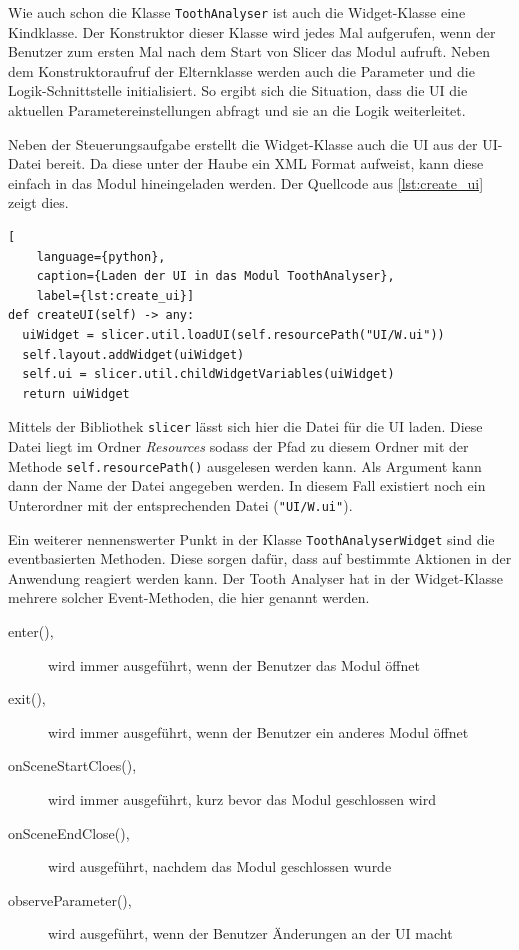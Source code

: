 Wie auch schon die Klasse \texttt{ToothAnalyser} ist auch die Widget-Klasse eine
Kindklasse. Der Konstruktor dieser Klasse wird jedes Mal aufgerufen, wenn der Benutzer
zum ersten Mal nach dem Start von Slicer das Modul aufruft. Neben dem
Konstruktoraufruf der Elternklasse werden auch die Parameter und die Logik-Schnittstelle
initialisiert. So ergibt sich die Situation, dass die \ac{UI} die aktuellen Parametereinstellungen
abfragt und sie an die Logik weiterleitet.

Neben der Steuerungsaufgabe erstellt die Widget-Klasse auch die \ac{UI} aus der
\ac{UI}-Datei bereit. Da diese unter der Haube ein \ac{XML} Format aufweist,
kann diese einfach in das Modul hineingeladen werden. Der Quellcode aus \ref{lst:create_ui}
zeigt dies.

\begin{lstlisting}[
    language={python},
    caption={Laden der UI in das Modul ToothAnalyser},
    label={lst:create_ui}]
def createUI(self) -> any:
  uiWidget = slicer.util.loadUI(self.resourcePath("UI/W.ui"))
  self.layout.addWidget(uiWidget)
  self.ui = slicer.util.childWidgetVariables(uiWidget)
  return uiWidget
\end{lstlisting}

Mittels der Bibliothek \texttt{slicer} lässt sich hier die Datei für die \ac{UI}
laden. Diese Datei liegt im Ordner \textit{Resources} sodass der Pfad zu diesem
Ordner mit der Methode \texttt{self.resourcePath()} ausgelesen werden kann. Als
Argument kann dann der Name der Datei angegeben werden. In diesem Fall existiert
noch ein Unterordner mit der entsprechenden Datei (\texttt{"UI/W.ui"}).

Ein weiterer nennenswerter Punkt in der Klasse \texttt{ToothAnalyserWidget} sind
die eventbasierten Methoden. Diese sorgen dafür, dass auf bestimmte Aktionen in der
Anwendung reagiert werden kann. Der Tooth Analyser hat in der Widget-Klasse
mehrere solcher Event-Methoden, die hier genannt werden.

\begin{description}
	\item[enter(),] wird immer ausgeführt, wenn der Benutzer das Modul öffnet

	\item[exit(),] wird immer ausgeführt, wenn der Benutzer ein anderes Modul
		öffnet

	\item[onSceneStartCloes(),] wird immer ausgeführt, kurz bevor das Modul
		geschlossen wird

	\item[onSceneEndClose(),] wird ausgeführt, nachdem das Modul geschlossen wurde

	\item[observeParameter(),] wird ausgeführt, wenn der Benutzer Änderungen an
		der \ac{UI} macht
\end{description}

